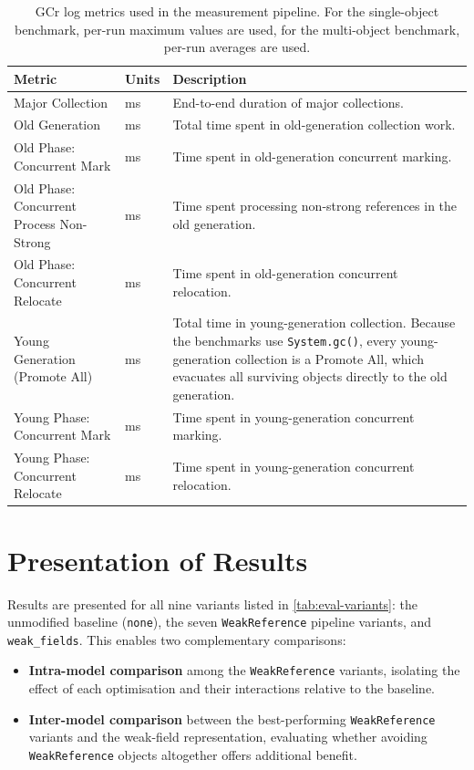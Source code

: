 \begin{table}[t]
\centering
\caption[\ac{GCr} log metrics in the measurement pipeline]{\ac{GCr} log metrics used in the measurement pipeline. For the single-object benchmark, per-run maximum values are used, for the multi-object benchmark, per-run averages are used.}
\label{tab:gc-log-metrics}
\begin{tabularx}{\textwidth}{@{}XlX@{}}
\toprule
\textbf{Metric} & \textbf{Units} & \textbf{Description} \\
\midrule
Major Collection & ms & End-to-end duration of major collections. \\
Old Generation & ms & Total time spent in old-generation collection work. \\
Old Phase: Concurrent Mark & ms & Time spent in old-generation concurrent marking. \\
Old Phase: Concurrent Process Non-Strong & ms & Time spent processing non-strong references in the old generation. \\
Old Phase: Concurrent Relocate & ms & Time spent in old-generation concurrent relocation. \\
Young Generation (Promote All) & ms & Total time in young-generation collection. Because the benchmarks use \texttt{System.gc()}, every young-generation collection is a Promote All, which evacuates all surviving objects directly to the old generation. \\
Young Phase: Concurrent Mark & ms & Time spent in young-generation concurrent marking. \\
Young Phase: Concurrent Relocate & ms & Time spent in young-generation concurrent relocation. \\
\bottomrule
\end{tabularx}
\end{table}

\section{Presentation of Results}
\label{sec:eval-results}

Results are presented for all nine variants listed in \cref{tab:eval-variants}: the unmodified baseline (\texttt{none}), the seven \texttt{WeakReference} pipeline variants, and \texttt{weak\_fields}. This enables two complementary comparisons:
\begin{itemize}
	\item \textbf{Intra-model comparison} among the \texttt{WeakReference} variants, isolating the effect of each optimisation and their interactions relative to the baseline.
	\item \textbf{Inter-model comparison} between the best-performing \texttt{WeakReference} variants and the weak-field representation, evaluating whether avoiding \texttt{WeakReference} objects altogether offers additional benefit.
\end{itemize}

